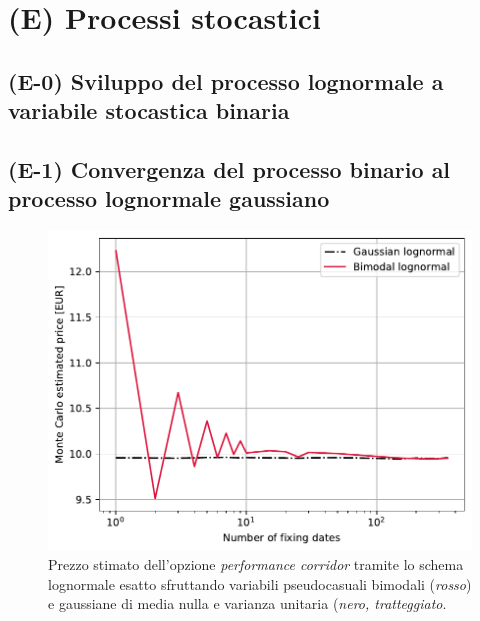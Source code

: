 \chapter{(E) Processi stocastici}

\section{(E-0) Sviluppo del processo lognormale a variabile stocastica binaria}
\lipsum[1-3]

\section{(E-1) Convergenza del processo binario al processo lognormale gaussiano}

\begin{figure}[t]
    \centering
    \includegraphics[scale=0.5]{graphs/OptionPriceBimodal_PriceVsM.pdf}
    \caption{Prezzo stimato dell'opzione \textit{performance corridor} tramite lo schema lognormale esatto sfruttando variabili pseudocasuali bimodali (\textit{rosso}) e gaussiane di media nulla e varianza unitaria (\textit{nero, tratteggiato}.}
    \label{fig:bimodal}
\end{figure}

\lipsum[1-3]